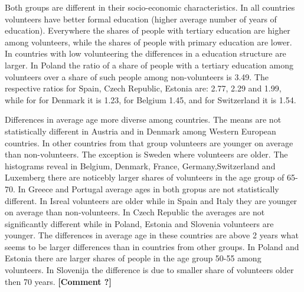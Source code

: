 \documentclass[10pt, letterpaper]{article}
\begin{document}
\begin{spacing}{1.4}
\begin{spacing}{.9}
\centering 
\begin{tiny} 
	 
      \label{DescT0} 
\end{tiny}
\end{spacing}

Both groups are different in their socio-economic characteristics. In all countries volunteers have better formal education (higher average number of years of education). Everywhere the shares of people with tertiary education are higher among volunteers, while the shares of people with primary education are lower. In countries with low volunteering the differences in a education structure are larger. In Poland the ratio of a share of people with a tertiary  education among volunteers over a share of such people among non-volunteers is 3.49. The respective ratios for Spain, Czech Republic, Estonia are: 2.77, 2.29 and 1.99, while for for Denmark it is 1.23, for Belgium 1.45, and for Switzerland it is 1.54. 

Differences in average age more diverse among countries. The means are  not statistically different  in Austria and in Denmark among Western European countries. In other countries from that group volunteers are younger  on average than non-volunteers. The exception is Sweden where volunteers are older. The histograms reveal in Belgium, Denmark, France, Germany,Switzerland and Luxemberg there are noticebly larger shares of volunteers in the age group of 65-70. In Greece and Portugal average ages in both gropus are not statistically different. In Isreal volunteers are older while in Spain and Italy they are younger on average than non-volunteers. In Czech Republic the averages are not significantly different while in Poland, Estonia and Slovenia volunteers are younger. The differences in average age in these countries are above 2 years what seems to be larger differences than in countries from other groups. In Poland and Estonia there are larger shares of people in the age group 50-55 among volunteers.  In Slovenija the difference is due to smaller share of volunteers older then 70 years. \textbf{[Comment ?]}


\end{spacing}
\end{document}
